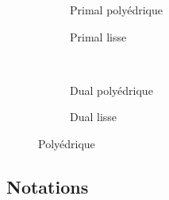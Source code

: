\begin{figure}[p]
\centering
\begin{subfigure}[t]{.5\textwidth}
    \centering
    
    \caption{Primal polyédrique}
\end{subfigure}%
\begin{subfigure}[t]{.5\textwidth}
    \centering
    
    \caption{Primal lisse}
\end{subfigure} \\
\begin{subfigure}[t]{.5\textwidth}
    \centering
    
    \caption{Dual polyédrique}
\end{subfigure}%
\begin{subfigure}[t]{.5\textwidth}
    \centering
    
    \caption{Dual lisse}
\end{subfigure}
\caption{}
\end{figure}

\begin{figure}[p]
    \centering
    
    \caption{Polyédrique}
\end{figure}

\subsection{Notations}


